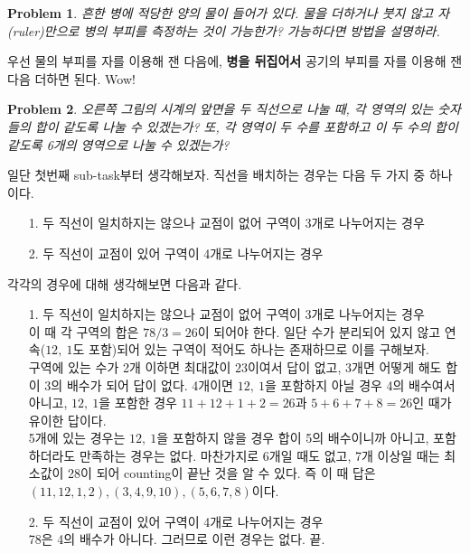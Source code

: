 \documentclass[a4paper,10pt]{article}
\newtheorem{prob}{Problem}
\begin{document}
\begin{prob}
	흔한 병에 적당한 양의 물이 들어가 있다. 물을 더하거나 붓지 않고 자(ruler)만으로 병의 부피를 측정하는 것이 가능한가? 가능하다면 방법을 설명하라.
\end{prob}
우선 물의 부피를 자를 이용해 잰 다음에, \textbf{병을 뒤집어서} 공기의 부피를 자를 이용해 잰 다음 더하면 된다. Wow!
\begin{prob}
	오른쪽 그림의 시계의 앞면을 두 직선으로 나눌 때, 각 영역의 있는 숫자들의 합이 같도록 나눌 수 있겠는가? 또, 각 영역이 두 수를 포함하고 이 두 수의 합이 같도록 6개의 영역으로 나눌 수 있겠는가?
\end{prob}
일단 첫번째 sub-task부터 생각해보자. 직선을 배치하는 경우는 다음 두 가지 중 하나이다.
\begin{enumerate}
	\item[1.] 두 직선이 일치하지는 않으나 교점이 없어 구역이 3개로 나누어지는 경우
	\item[2.] 두 직선이 교점이 있어 구역이 4개로 나누어지는 경우
\end{enumerate}
각각의 경우에 대해 생각해보면 다음과 같다.
\begin{enumerate}
	
	\item[1.] 두 직선이 일치하지는 않으나 교점이 없어 구역이 3개로 나누어지는 경우\\
	이 때 각 구역의 합은 $ 78/3=26 $이 되어야 한다. 일단 수가 분리되어 있지 않고 연속($ 12,\ 1 $도 포함)되어 있는 구역이 적어도 하나는 존재하므로 이를 구해보자.\\
	구역에 있는 수가 2개 이하면 최대값이 $ 23 $이여서 답이 없고, 3개면 어떻게 해도 합이 3의 배수가 되어 답이 없다. 4개이면 $ 12,\ 1 $을 포함하지 아닐 경우 4의 배수여서 아니고, $ 12,\ 1 $을 포함한 경우	$11+12+1+2=26$과 $5+6+7+8=26$인 때가 유이한 답이다.\\
	5개에 있는 경우는 $ 12,\ 1 $을 포함하지 않을 경우 합이 5의 배수이니까 아니고, 포함하더라도 만족하는 경우는 없다. 마찬가지로 6개일 때도 없고, 7개 이상일 때는 최소값이 28이 되어 counting이 끝난 것을 알 수 있다.
	즉 이 때 답은 $(11,12,1,2),(3,4,9,10),(5,6,7,8)$이다.
	
	\item[2.] 두 직선이 교점이 있어 구역이 4개로 나누어지는 경우\\
	78은 4의 배수가 아니다. 그러므로 이런 경우는 없다. 끝.
\end{enumerate}
\end{document}
